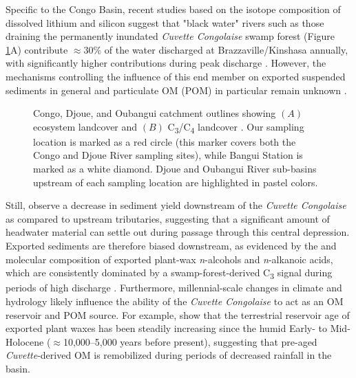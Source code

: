 Specific to the Congo Basin, recent studies based on the isotope composition of dissolved lithium and silicon suggest that "black water" rivers such as those draining the permanently inundated \textit{Cuvette Congolaise} swamp forest (Figure \ref{Ch5Fig:1}A) contribute $\approx 30$\% of the water discharged at Brazzaville/Kinshasa annually, with significantly higher contributions during peak discharge \citep{Cardinal:2010ir,Henchiri:2016jh}. However, the mechanisms controlling the influence of this end member on exported suspended sediments in general and particulate OM (POM) in particular remain unknown \citep{Spencer:2016ho}.

\begin{figure}[ht]
	\caption[Congo catchment map showing landcover and \%C\textsubscript{3} vs. \%C\textsubscript{4} vegatation]{Congo, Djoue, and Oubangui catchment outlines showing $(A)$ ecosystem landcover \citep{Mayaux:2004uw} and $(B)$ C\textsubscript{3}/C\textsubscript{4} landcover \citep{Still:2010wh}. Our sampling location is marked as a red circle (this marker covers both the Congo and Djoue River sampling sites), while Bangui Station \citep{Bouillon:2012cw,Bouillon:2014ko} is marked as a white diamond. Djoue and Oubangui River sub-basins upstream of each sampling location are highlighted in pastel colors.}
	\label{Ch5Fig:1} 
\end{figure}

Still, \citet{Laraque:2009fz} observe a decrease in sediment yield downstream of the \textit{Cuvette Congolaise} as compared to upstream tributaries, suggesting that a significant amount of headwater material can settle out during passage through this central depression. Exported sediments are therefore biased downstream, as evidenced by the  and molecular composition of exported plant-wax \textit{n}-alcohols and \textit{n}-alkanoic acids, which are consistently dominated by a swamp-forest-derived C\textsubscript{3} signal during periods of high discharge \citep{Hemingway:2016bq}. Furthermore, millennial-scale changes in climate and hydrology likely influence the ability of the \textit{Cuvette Congolaise} to act as an OM reservoir and POM source. For example, \citet{Schefuss:2016cp} show that the terrestrial reservoir age of exported plant waxes has been steadily increasing since the humid Early- to Mid-Holocene ($\approx$10,000--5,000 years before present), suggesting that pre-aged \textit{Cuvette}-derived OM is remobilized during periods of decreased rainfall in the basin.

